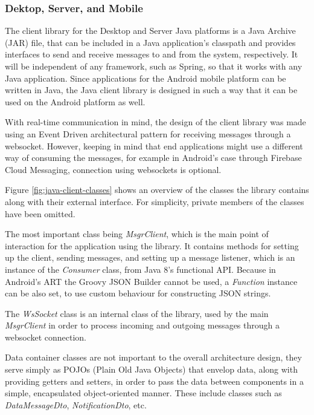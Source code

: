 \subsubsection*{Dektop, Server, and Mobile} \label{design:client-java}
The client library for the Desktop and Server Java platforms is a Java Archive (JAR) file, that can be included in a Java application's classpath and provides interfaces to send and receive messages to and from the system, respectively. It will be independent of any framework, such as Spring, so that it works with any Java application. Since applications for the Android mobile platform can be written in Java, the Java client library is designed in such a way that it can be used on the Android platform as well.

With real-time communication in mind, the design of the client library was made using an Event Driven architectural pattern for receiving messages through a websocket. However, keeping in mind that end applications might use a different way of consuming the messages, for example in Android's case through Firebase Cloud Messaging, connection using websockets is optional.

Figure \ref{fig:java-client-classes} shows an overview of the classes the library contains along with their external interface. For simplicity, private members of the classes have been omitted.

The most important class being \textit{MsgrClient}, which is the main point of interaction for the application using the library. It contains methods for setting up the client, sending messages, and setting up a message listener, which is an instance of the \textit{Consumer} class, from Java 8's functional API. Because in Android's ART the Groovy JSON Builder cannot be used, a \textit{Function} instance can be also set, to use custom behaviour for constructing JSON strings.

The \textit{WsSocket} class is an internal class of the library, used by the main \textit{MsgrClient} in order to process incoming and outgoing messages through a websocket connection.

Data container classes are not important to the overall architecture design, they serve simply as POJOs (Plain Old Java Objects) that envelop data, along with providing getters and setters, in order to pass the data between components in a simple, encapsulated object-oriented manner. These include classes such as \textit{DataMessageDto}, \textit{NotificationDto}, etc.

